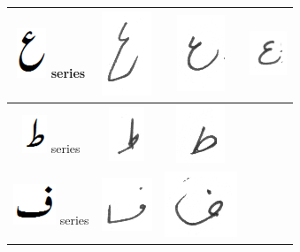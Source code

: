 \begin{table}[h]
\begin{tabular}{@{}cccc@{}}
\hline
\includegraphics[scale=0.15]{aien_orig} series & 
\includegraphics[scale=0.15]{195} & \includegraphics[scale=0.15]{196} &
\includegraphics[scale=0.15]{197}  \\
\hline
\includegraphics[scale=0.15]{tuay_orig} series & \includegraphics[scale=0.15]{198} & 
\includegraphics[scale=0.20]{199} &  \\
\hline
\includegraphics[scale=0.25]{fay_orig} series & \includegraphics[scale=0.25]{200} & \includegraphics[scale=0.20]{201} &  \\

\end{tabular}
\end{table}
